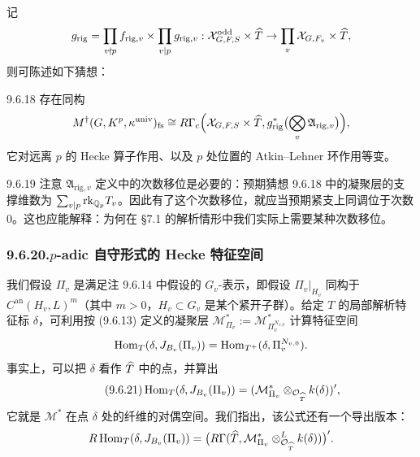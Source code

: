 记
\[
g_{\mathrm{rig}}=\prod_{v\nmid p}f_{\mathrm{rig},v}\times\prod_{v|p}g_{\mathrm{rig},v}:\mathcal{X}^{\mathrm{odd}}_{G,F,S}\times\widehat T\to\prod_v\mathcal{X}_{G,F_v}\times\widehat T,
\]
则可陈述如下猜想：

\begin{conj}{9.6.18}\label{conj:a4-16-9-6-18}
存在同构
\[
M^\dagger(G,K^p,\kappa^{\mathrm{univ}})_{\mathrm{fs}}\cong R\Gamma_c\Bigl(\mathcal{X}_{G,F,S}\times\widehat T,g_{\mathrm{rig}}^*\bigl(\bigotimes_v\mathfrak A_{\mathrm{rig},v}\bigr)\Bigr),
\]
它对远离 $p$ 的 Hecke 算子作用、以及 $p$ 处位置的 Atkin--Lehner 环作用等变。
\end{conj}

\begin{rem}{9.6.19}\label{rem:a4-16-9-6-19}
注意 $\mathfrak A_{\mathrm{rig},v}$ 定义中的次数移位是必要的：预期猜想 9.6.18 中的凝聚层的支撑维数为 $\sum_{v|p}\mathrm{rk}_{\mathbb{Q}_p}T_v$。因此有了这个次数移位，就应当预期紧支上同调位于次数 $0$。这也应能解释：为何在 §7.1 的解析情形中我们实际上需要某种次数移位。
\end{rem}

\subsubsection*{9.6.20.\quad $p$-adic 自守形式的 Hecke 特征空间}

我们假设 $\Pi_v$ 是满足注 9.6.14 中假设的 $G_v$-表示，即假设 $\Pi_v|_{H_v}$ 同构于 $C^{\mathrm{an}}(H_v,L)^m$（其中 $m>0$，$H_v\subset G_v$ 是某个紧开子群）。给定 $T$ 的局部解析特征标 $\delta$，可利用按 (9.6.13) 定义的凝聚层 $\mathcal M^*_{\Pi_v}:=\mathcal M^*_{\Pi_v^{N_{v,0}}}$ 计算特征空间
\[
\operatorname{Hom}_T(\delta,J_{B_v}(\Pi_v))=\operatorname{Hom}_{T^+}(\delta,\Pi_v^{N_{v,0}}).
\]
事实上，可以把 $\delta$ 看作 $\widehat T$ 中的点，并算出
\begin{equation}\tag{9.6.21}\label{eq:a4-16-9-6-21}
\operatorname{Hom}_T(\delta,J_{B_v}(\Pi_v))=(\mathcal M^*_{\Pi_v}\otimes_{\mathcal{O}_{\widehat T}}k(\delta))',
\end{equation}
它就是 $\mathcal M^*$ 在点 $\delta$ 处的纤维的对偶空间。我们指出，该公式还有一个导出版本：
\[
R\operatorname{Hom}_T(\delta,J_{B_v}(\Pi_v))=\bigl(R\Gamma(\widehat T,\mathcal M^*_{\Pi_v}\otimes^{L}_{\mathcal{O}_{\widehat T}}k(\delta))\bigr)'.
\]

